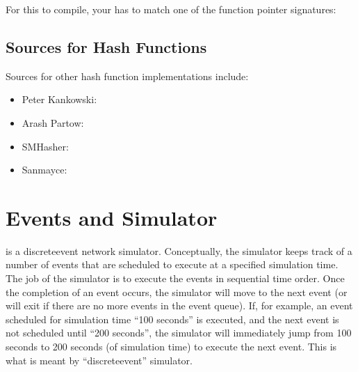 \documentclass[letterpaper,10pt,english]{sphinxmanual}
\renewcommand{\sphinxcode}[1]{\texttt{\small{#1}}}
\begin{document}
For this to compile, your \sphinxcode{} has to match one of the function pointer
signatures:

\begin{sphinxVerbatim}[commandchars=\\\{\}]
       
       
\end{sphinxVerbatim}


\section{Sources for Hash Functions}
\label{\detokenize{hash-functions:sources-for-hash-functions}}
Sources for other hash function implementations include:
\begin{itemize}
\item {} 
Peter Kankowski: 

\item {} 
Arash Partow:    

\item {} 
SMHasher:        

\item {} 
Sanmayce:        

\end{itemize}


\chapter{Events and Simulator}
\label{\detokenize{events:events-and-simulator}}\label{\detokenize{events::doc}}
 is a discrete\sphinxhyphen{}event network simulator.  Conceptually, the simulator
keeps track of a number of events that are scheduled to execute at a
specified simulation time.  The job of the simulator is to execute the
events in sequential time order.  Once the completion of an event occurs,
the simulator will move to the next event (or will exit if there are no
more events in the event queue).  If, for example, an event scheduled
for simulation time “100 seconds” is executed, and the next event is not
scheduled until “200 seconds”, the simulator will immediately jump from
100 seconds to 200 seconds (of simulation time) to execute the next event.
This is what is meant by “discrete\sphinxhyphen{}event” simulator.
\end{document}

